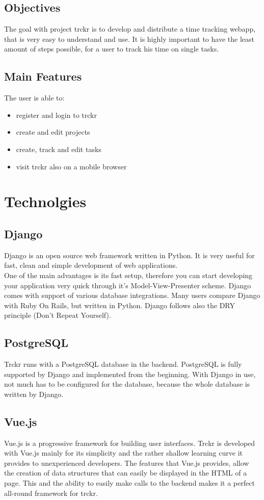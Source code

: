\documentclass[a4paper, 12pt, headsepline]{scrartcl}
\begin{document}
\subsection{Objectives}
The goal with project trckr is to develop and distribute a time tracking webapp, that is very easy to understand and use. It is highly important to
have the least amount of steps possible, for a user to track his time on single tasks.

\subsection{Main Features}
The user is able to:
\begin{itemize}
    \item register and login to trckr
    \item create and edit projects
    \item create, track and edit tasks
    \item visit trckr also on a mobile browser
\end{itemize}


\section{Technolgies}


\subsection{Django}
Django is an open source web framework written in Python. It is very useful for fast, clean and simple development of web applications.\\
One of the main advantages is its fast setup, therefore you can start developing your application very quick through it's Model-View-Presenter scheme.
Django comes with support of various database integrations. Many users compare Django with Ruby On Rails, but written in Python.
Django follows also the DRY principle (Don't Repeat Yourself).

\subsection{PostgreSQL}
Trckr runs with a PostgreSQL database in the backend. PostgreSQL is fully supported by Django and
implemented from the beginning. With Django in use, not much has to be configured for the database, because
the whole database is written by Django.

\subsection{Vue.js}
Vue.js is a progressive framework for building user interfaces.\cite{vuejs} Trckr is developed with Vue.js mainly for its simplicity and the rather shallow learning curve it provides to unexperienced developers.
The features that Vue.js provides, allow the creation of data structures that can easily be displayed in the HTML of a page. This and the ability to easily make calls to the backend makes it a perfect all-round framework for trckr.
\end{document}
